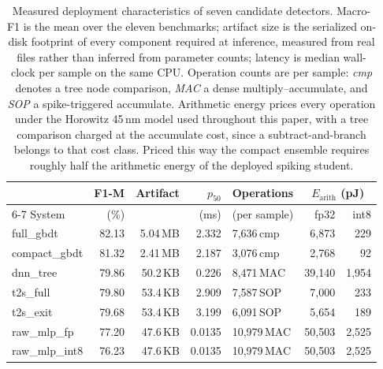 %
%

\begin{table}[!t]
\centering
\caption{Measured deployment characteristics of seven candidate detectors.
Macro-F1 is the mean over the eleven benchmarks; artifact size is the serialized
on-disk footprint of every component required at inference, measured from real
files rather than inferred from parameter counts; latency is median wall-clock
per sample on the same CPU. Operation counts are per sample: \emph{cmp} denotes a
tree node comparison, \emph{MAC} a dense multiply--accumulate, and \emph{SOP} a
spike-triggered accumulate. Arithmetic energy prices every operation under the
Horowitz 45\,nm model used throughout this paper, with a tree comparison charged
at the accumulate cost, since a subtract-and-branch belongs to that cost class.
Priced this way the compact ensemble requires roughly half the arithmetic energy
of the deployed spiking student.}
\label{tab:dep:systems}
\small
\begin{tabular}{lrrrlrr}
\toprule
 & F1-M & Artifact & $p_{50}$ & Operations & \multicolumn{2}{c}{$E_\mathrm{arith}$ (pJ)} \\
\cmidrule(lr){6-7}
System & (\%) & & (ms) & (per sample) & fp32 & int8 \\
\midrule
full\_gbdt     & 82.13 & 5.04\,MB  & 2.332  & 7,636\,cmp  & 6,873  & 229   \\
compact\_gbdt  & 81.32 & 2.41\,MB  & 2.187  & 3,076\,cmp  & 2,768  & 92    \\
dnn\_tree      & 79.86 & 50.2\,KB  & 0.226  & 8,471\,MAC  & 39,140 & 1,954 \\
t2s\_full      & 79.80 & 53.4\,KB  & 2.909  & 7,587\,SOP  & 7,000  & 233   \\
t2s\_exit      & 79.68 & 53.4\,KB  & 3.199  & 6,091\,SOP  & 5,654  & 189   \\
raw\_mlp\_fp   & 77.20 & 47.6\,KB  & 0.0135 & 10,979\,MAC & 50,503 & 2,525 \\
raw\_mlp\_int8 & 76.23 & 47.6\,KB  & 0.0135 & 10,979\,MAC & 50,503 & 2,525 \\
\bottomrule
\end{tabular}
\end{table}

